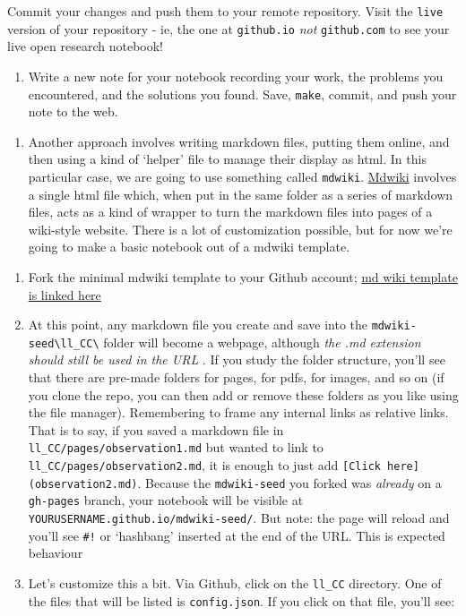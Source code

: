 \documentclass[english,]{book}
\providecommand{\tightlist}{%
  \setlength{\itemsep}{0pt}\setlength{\parskip}{0pt}}
\begin{document}
Commit your changes and push them to your remote repository. Visit the
\texttt{live} version of your repository - ie, the one at
\texttt{github.io} \emph{not} \texttt{github.com} to see your live open
research notebook!

\begin{enumerate}
\def\labelenumi{\roman{enumi}.}
\tightlist
\item
  Write a new note for your notebook recording your work, the problems
  you encountered, and the solutions you found. Save, \texttt{make},
  commit, and push your note to the web.
\end{enumerate}

\begin{enumerate}
\def\labelenumi{\arabic{enumi}.}
\setcounter{enumi}{1}
\tightlist
\item
  Another approach involves writing markdown files, putting them online,
  and then using a kind of `helper' file to manage their display as
  html. In this particular case, we are going to use something called
  \texttt{mdwiki}.
  \href{https://dynalon.github.io/mdwiki/\#!index.md}{Mdwiki} involves a
  single html file which, when put in the same folder as a series of
  markdown files, acts as a kind of wrapper to turn the markdown files
  into pages of a wiki-style website. There is a lot of customization
  possible, but for now we're going to make a basic notebook out of a
  mdwiki template.
\end{enumerate}

\begin{enumerate}
\def\labelenumi{\alph{enumi}.}
\item
  Fork the minimal mdwiki template to your Github account;
  \href{https://github.com/exalted/mdwiki-seed}{md wiki template is
  linked here}
\item
  At this point, any markdown file you create and save into the
  \texttt{mdwiki-seed\textbackslash{}ll\_CC\textbackslash{}} folder will
  become a webpage, although \emph{the .md extension should still be
  used in the URL} . If you study the folder structure, you'll see that
  there are pre-made folders for pages, for pdfs, for images, and so on
  (if you clone the repo, you can then add or remove these folders as
  you like using the file manager). Remembering to frame any internal
  links as relative links. That is to say, if you saved a markdown file
  in \texttt{ll\_CC/pages/observation1.md} but wanted to link to
  \texttt{ll\_CC/pages/observation2.md}, it is enough to just add
  \texttt{{[}Click\ here{]}(observation2.md)}. Because the
  \texttt{mdwiki-seed} you forked was \emph{already} on a
  \texttt{gh-pages} branch, your notebook will be visible at
  \texttt{YOURUSERNAME.github.io/mdwiki-seed/}. But note: the page will
  reload and you'll see \texttt{\#!} or `hashbang' inserted at the end
  of the URL. This is expected behaviour
\item
  Let's customize this a bit. Via Github, click on the \texttt{ll\_CC}
  directory. One of the files that will be listed is
  \texttt{config.json}. If you click on that file, you'll see:
\end{enumerate}
\end{document}
